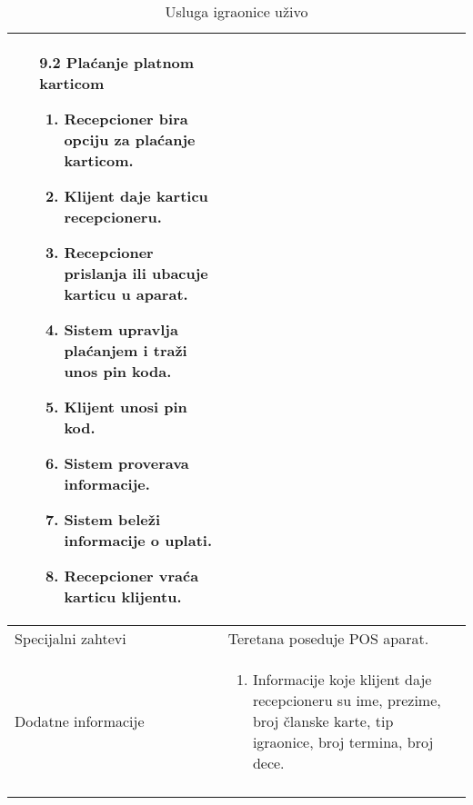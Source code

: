 \documentclass[../../main.tex]{subfiles}
\begin{document}
\begin{longtable}{| p{} | p{} |}
\begin{itemize}
\item [9.2] Plaćanje platnom karticom
\begin{enumerate}
\item Recepcioner bira opciju za plaćanje karticom.
\item Klijent daje karticu recepcioneru.
\item Recepcioner prislanja ili ubacuje karticu u aparat.
\item Sistem upravlja plaćanjem i traži unos pin koda.
\item Klijent unosi pin kod.
\item Sistem proverava informacije.
\item Sistem beleži informacije o uplati.
\item Recepcioner vraća karticu klijentu.
\end{enumerate}
 \end{itemize}
\\
\hline
    Specijalni zahtevi & Teretana poseduje POS aparat. \\
\hline
    Dodatne informacije &
    \begin{enumerate}
     \item Informacije koje klijent daje recepcioneru su ime, prezime, broj članske karte, tip igraonice, broj termina, broj dece.
    \end{enumerate}\\
\hline
\caption{Usluga igraonice uživo}
\end{longtable}
\end{document}
